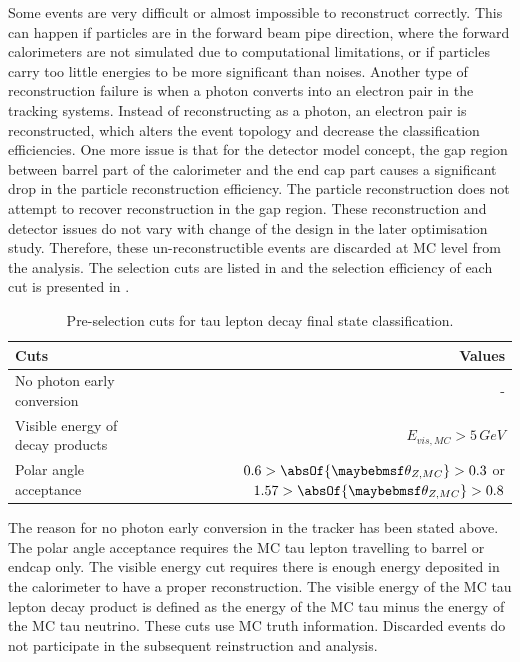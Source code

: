 Some events are very difficult or almost impossible to reconstruct correctly. This can happen if particles are in the forward beam pipe direction, where the forward calorimeters are not simulated due to computational limitations, or if particles carry too little energies to be more significant than noises. Another type of reconstruction failure is when a photon converts into an electron pair in the tracking systems. Instead of reconstructing as a photon, an electron pair is reconstructed, which  alters the event topology and decrease the classification efficiencies. One more issue is that for the \ILD detector model concept, the gap region between barrel part of the calorimeter and the end cap part causes a significant drop in the particle reconstruction efficiency. The \pandora particle reconstruction does not attempt to recover reconstruction in the gap region. These reconstruction and detector issues do not vary with change of the \ECAL design in the later optimisation study. Therefore, these un-reconstructible events are discarded at MC level from the analysis. The selection cuts are listed in  and the selection efficiency of each cut is presented in .



\begin{table}[htbp]\centering
\smallskip
\begin{tabular}{l r}
\hline
\hline
Cuts & Values\\
\hline
No photon early conversion & - \\
Visible energy of decay products & $ E_{vis,MC} > 5\,GeV$ \\
Polar angle acceptance & $0.6 > \absOf{\theta_{Z,MC}} > 0.3$ or $1.57 > \absOf{\theta_{Z,MC}} > 0.8$ \\
\hline
\hline
\end{tabular}
\caption[Pre-selection cuts for tau lepton decay final state classification.]
{Pre-selection cuts for tau lepton decay final state classification.}
\label{tab:tauPreSel}
\end{table}

The reason for no photon early conversion in the tracker has been stated above. The polar angle acceptance requires the MC tau lepton travelling to barrel or endcap only. The visible energy cut requires there is enough energy deposited in the calorimeter to have a proper reconstruction.   The visible energy of the MC tau lepton decay product is defined as the energy of the MC tau minus the energy of the MC tau neutrino. These cuts use MC truth information. Discarded events do not participate in the subsequent reinstruction and analysis.


